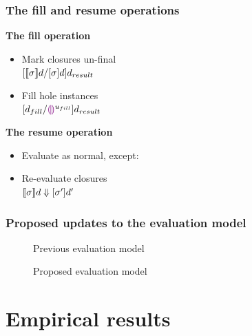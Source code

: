 \documentclass{beamer}
\begin{document}
\begin{frame}
  \frametitle{The fill and resume operations}

  \centering
  \begin{minipage}[t]{.45\textwidth}
    \textbf{The fill operation}

    \begin{itemize}
    \item Mark closures un-final \\ $[\llbracket\sigma\rrbracket d/[\sigma]d]d_{result}$
    \item Fill hole instances \\ $[d_{fill}/\textcolor{violet}{\llparenthesis}\textcolor{violet}{\rrparenthesis}^{u_{fill}}]d_{result}$
    \end{itemize}
  \end{minipage}
  \qquad
  \begin{minipage}[t]{.45\textwidth}
    \textbf{The resume operation}

    \begin{itemize}
    \item Evaluate as normal, except:
    \item Re-evaluate closures \\ $\llbracket\sigma\rrbracket d\Downarrow [\sigma']d'$
    \end{itemize}
  \end{minipage}
\end{frame}

\begin{frame}[allowframebreaks]
  \frametitle{Proposed updates to the evaluation model}

  \begin{figure}
    \centering
    \maxsizebox{\textwidth}{15em}{
      
    }
    \caption{Previous evaluation model}
    \label{fig:prev-evaluation-call-graph}
  \end{figure}

  \begin{figure}
    \centering
    \maxsizebox{\textwidth}{15em}{
      
    }
    \caption{Proposed evaluation model}
    \label{fig:current-evaluation-call-graph}
  \end{figure}
\end{frame}

\section{Empirical results}
\end{document}
